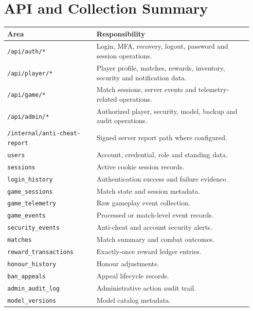 \documentclass[12pt,a4paper,oneside]{report}
\begin{document}
\chapter{API and Collection Summary}
\begin{longtable}{p{42mm}p{115mm}}
\toprule
Area & Responsibility\\
\midrule
\texttt{/api/auth/*} & Login, MFA, recovery, logout, password and session operations.\\
\texttt{/api/player/*} & Player profile, matches, rewards, inventory, security and notification data.\\
\texttt{/api/game/*} & Match sessions, server events and telemetry-related operations.\\
\texttt{/api/admin/*} & Authorized player, security, model, backup and audit operations.\\
\texttt{/internal/anti-cheat-report} & Signed server report path where configured.\\
\texttt{users} & Account, credential, role and standing data.\\
\texttt{sessions} & Active cookie session records.\\
\texttt{login\_history} & Authentication success and failure evidence.\\
\texttt{game\_sessions} & Match state and session metadata.\\
\texttt{game\_telemetry} & Raw gameplay event collection.\\
\texttt{game\_events} & Processed or match-level event records.\\
\texttt{security\_events} & Anti-cheat and account security alerts.\\
\texttt{matches} & Match summary and combat outcomes.\\
\texttt{reward\_transactions} & Exactly-once reward ledger entries.\\
\texttt{honour\_history} & Honour adjustments.\\
\texttt{ban\_appeals} & Appeal lifecycle records.\\
\texttt{admin\_audit\_log} & Administrative action audit trail.\\
\texttt{model\_versions} & Model catalog metadata.\\
\bottomrule
\end{longtable}
\end{document}
